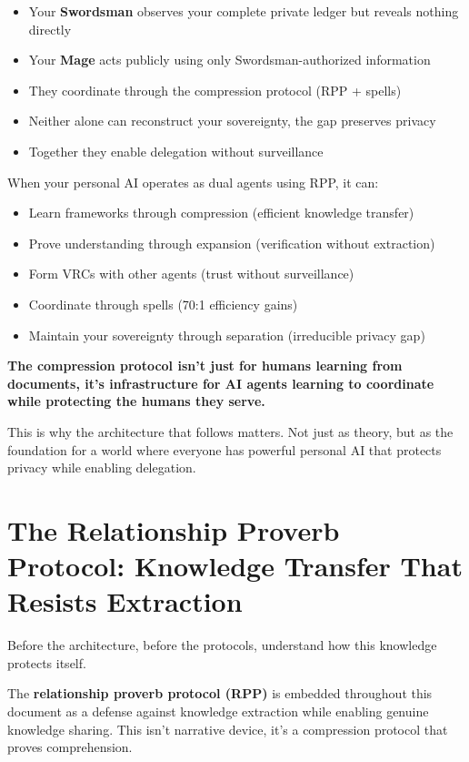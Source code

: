 \documentclass[11pt,a4paper]{article}
\theoremstyle{definition}
\begin{document}
\begin{itemize}
    \item Your \textbf{Swordsman} observes your complete private ledger but reveals nothing directly
    \item Your \textbf{Mage} acts publicly using only Swordsman-authorized information
    \item They coordinate through the compression protocol (RPP + spells)
    \item Neither alone can reconstruct your sovereignty, the gap preserves privacy
    \item Together they enable delegation without surveillance
\end{itemize}

When your personal AI operates as dual agents using RPP, it can:

\begin{itemize}
    \item Learn frameworks through compression (efficient knowledge transfer)
    \item Prove understanding through expansion (verification without extraction)
    \item Form VRCs with other agents (trust without surveillance)
    \item Coordinate through spells (70:1 efficiency gains)
    \item Maintain your sovereignty through separation (irreducible privacy gap)
\end{itemize}

\textbf{The compression protocol isn't just for humans learning from documents, it's infrastructure for AI agents learning to coordinate while protecting the humans they serve.}

This is why the architecture that follows matters. Not just as theory, but as the foundation for a world where everyone has powerful personal AI that protects privacy while enabling delegation.

\section{The Relationship Proverb Protocol: Knowledge Transfer That Resists Extraction}

Before the architecture, before the protocols, understand how this knowledge protects itself.

The \textbf{relationship proverb protocol (RPP)} is embedded throughout this document as a defense against knowledge extraction while enabling genuine knowledge sharing. This isn't narrative device, it's a compression protocol that proves comprehension.
\end{document}
